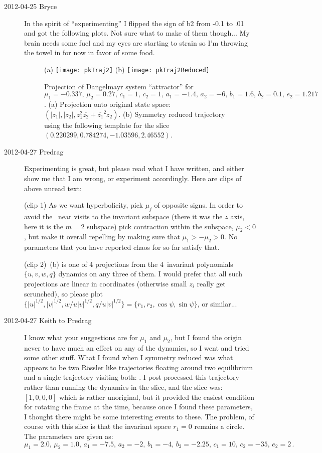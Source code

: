 \begin{description}
\item[2012-04-25 Bryce] In the spirit of ``experimenting'' I flipped the
sign of b2 from -0.1 to .01 and got the following plots. Not sure what to
make of them though... My brain needs some fuel and my eyes are starting
to strain so I'm throwing the towel in for now in favor of some food.

\begin{figure}[H]
\centering
 (a) \texttt{[image: pkTraj2]}
 (b) \texttt{[image: pkTraj2Reduced]}
\caption{Projection of Dangelmayr system 
``attractor'' for $\mu_1 = -0.337,\, \mu_2 = 0.27,\, c_1 = 1,\, c_2 =
1,\, a_1 = -1.4,\, a_2 = -6,\, b_1 = 1.6,\,  b_2 = 0.1,\, e_2 = 1.217$.
(a) Projection onto original state space:
$(|z_1|,|z_2|,z_1^2\overline{z_2}+\overline{z_1}^2 z_2)$. (b) Symmetry
reduced trajectory using the following template for the slice $(0.220299,
0.784274, -1.03596, 2.46552)$.
}
\label{fig:pkfig1}
\end{figure}

\item[2012-04-27 Predrag] Experimenting is great, but please read what I
have written, and either show me that I am wrong, or experiment
accordingly. Here are clips of above unread text:

(clip 1) As we want hyperbolicity, pick $\mu_j$ of opposite signs. In
order to avoid the \cLe\ near visits to the invariant subspace (there it
was the $z$ axis, here it is the $m=2$ subspace) pick contraction within
the subspace, $\mu_2 < 0$, but make it overall repelling by making sure
that $\mu_1 > -\mu_2 > 0$. No parameters that you have reported chaos for
so far satisfy that.

(clip 2) \,(b) is one of 4
projections from the 4\dmn\ invariant polynomials $\{u,v,w,q\}$ dynamics
on any three of them. I would prefer that all such projections are linear
in coordinates (otherwise small $z_i$ really get scrunched), so please
plot $\{|u|^{1/2},|v|^{1/2},w/u |v|^{1/2} ,q/u |v|^{1/2} \}
= \{r_1,r_2, \cos\psi, \sin\psi \}$, or similar...

\item[2012-04-27 Keith to Predrag] I know what your suggestions are for
$\mu_1$ and $\mu_2$, but I found the origin never to have much an effect
on any of the dynamics, so I went and tried some other stuff.  What I
found when I symmetry reduced was what appears to be two R\"ossler like
trajectories floating around two equilibrium and a single trajectory
visiting both: .  I post processed this
trajectory rather than running the dynamics in the slice, and the slice
was: $[1, 0, 0, 0]$ which is rather unoriginal, but it provided the
easiest condition for rotating the frame at the time, because once I
found these parameters, I thought there might be some interesting events
to these.  The problem, of course with this slice is that the invariant
space $r_1 = 0$ remains a circle.
    The parameters are given as:
    $\mu_1 = 2.0 ,\, \mu_2 = 1.0,\, a_1 = -7.5,\, a_2 = -2,\,
      b_1 = -4,\,  b_2 = -2.25,\, c_1 = 10,\, c_2 = -35,\, e_2 = 2 \,.$


\end{description}
